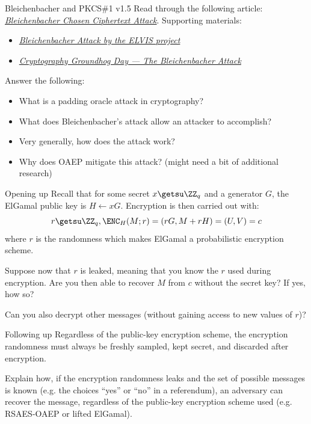 \documentclass{homework}
\begin{document}
\begin{task}{Bleichenbacher and PKCS\#1 v1.5}
  Read through the following article: \href{https://www.shysecurity.com/post/20160622-Bleichenbacher%20Attack}{\textit{Bleichenbacher Chosen Ciphertext Attack}}.
  Supporting materials:
  \begin{itemize}
    \item \href{https://wiki.elvis.science/index.php?title=Bleichenbacher_Attack#Steps_of_the_Attack}{\textit{Bleichenbacher Attack by the ELVIS project}}
    \item \href{https://asecuritysite.com/blog/2022-08-25_Crypto-Groundhog-Day---The-Bleichenbacher-Attack-4b85fc4accf4.html}{\textit{Cryptography Groundhog Day — The Bleichenbacher Attack}}
  \end{itemize}

  Answer the following:
  \begin{itemize}
    \item What is a padding oracle attack in cryptography?
    \item What does Bleichenbacher's attack allow an attacker to accomplish?
    \item Very generally, how does the attack work?
    \item Why does OAEP mitigate this attack? (might need a bit of additional research)
  \end{itemize}
\end{task}

\begin{task}{Opening up}
  Recall that for some secret $x\getsu\ZZ_q$ and a generator $G$, the ElGamal public key is $H\gets xG$.
  Encryption is then carried out with:
  \[
    r \getsu \ZZ_q, \ENC_H(M; r) = (rG, M + rH) = (U, V) = c
  \]
  where $r$ is the randomness which makes ElGamal a probabilistic encryption scheme.

  Suppose now that $r$ is leaked, meaning that you know the $r$ used during encryption.
  Are you then able to recover $M$ from $c$ without the secret key?
  If yes, how so?

  Can you also decrypt other messages (without gaining access to new values of $r$)?
\end{task}

\begin{task}{Following up}
  Regardless of the public-key encryption scheme, the encryption randomness must always be freshly sampled, kept secret, and discarded after encryption.

  Explain how, if the encryption randomness leaks and the set of possible messages is known (e.g. the choices \enquote{yes} or \enquote{no} in a referendum), an adversary can recover the message, regardless of the public-key encryption scheme used (e.g. RSAES-OAEP or lifted ElGamal).
\end{task}
\end{document}
